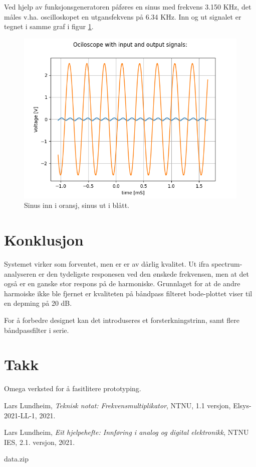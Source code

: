 \documentclass[a4paper,11pt,norsk]{article}
\begin{document}
Ved hjelp av funksjonsgeneratoren påføres en sinus med frekvens 3.150 KHz, det måles v.ha. oscilloskopet en utgansfekvens på 6.34 KHz. Inn og ut signalet er tegnet i samme graf i figur \ref{fig:Skop}.

\begin{figure}[H]
  \centering
  \includegraphics[width=1\textwidth]{ScopeOut.png} 
  \caption{Sinus inn i oransj, sinus ut i blått.}
  \label{fig:Skop}
\end{figure}


\section{Konklusjon}
\label{sec:konklusjon}

Systemet virker som forventet, men er er av dårlig kvalitet. Ut ifra spectrum-analyseren er den tydeligste responesen ved den ønskede frekvensen, men at det også er en ganske stor respons på de harmoniske. Grunnlaget for at de andre harmoiske ikke ble fjernet er kvaliteten på båndpass filteret bode-plottet viser til en depming på 20 dB.

For å forbedre designet kan det introduseres et forsterkningstrinn, samt flere båndpassfilter i serie.

\section{Takk}
Omega verksted for å fasitlitere prototyping.

\newpage
{}
{}
\begin{thebibliography}{99}

  Lars	Lundheim,
  \emph{Teknisk notat: Frekvensmultiplikator},
  NTNU,
  1.1 versjon,
  Elsys-2021-LL-1,
  2021.

  Lars	Lundheim,
  \emph{Eit hjelpehefte: Innføring i analog og digital elektronikk},
  NTNU IES,
  2.1. versjon,
  2021.

\end{thebibliography}

{}
\appendix
\label{sec:Vedlegg}
data.zip
\end{document}
